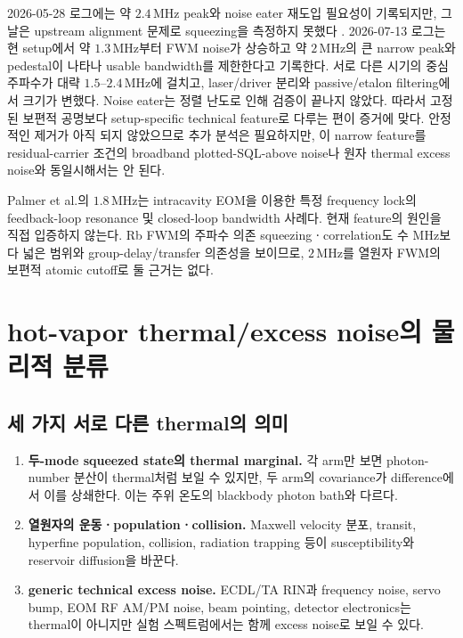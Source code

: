 \documentclass[11pt,a4paper]{article}
\newcommand{\MHz}{\,\mathrm{MHz}}
\begin{document}
2026-05-28 로그에는 약 $2.4\MHz$ peak와 noise eater 재도입 필요성이 기록되지만,
그날은 upstream alignment 문제로 squeezing을 측정하지 못했다
\cite{ExperimentLog20260528}. 2026-07-13 로그는 현 setup에서 약 $1.3\MHz$부터
FWM noise가 상승하고 약 $2\MHz$의 큰 narrow peak와 pedestal이 나타나 usable
bandwidth를 제한한다고 기록한다\cite{ExperimentLog20260713}. 서로 다른 시기의
중심주파수가 대략 $1.5$--$2.4\MHz$에 걸치고, laser/driver 분리와 passive/etalon
filtering에서 크기가 변했다. Noise eater는 정렬 난도로 인해 검증이 끝나지 않았다.
따라서 고정된 보편적 공명보다 setup-specific technical feature로 다루는 편이 증거에
맞다. 안정적인 제거가 아직 되지 않았으므로 추가 분석은 필요하지만, 이 narrow
feature를 residual-carrier 조건의
broadband plotted-SQL-above noise나 원자 thermal excess noise와 동일시해서는 안 된다.

Palmer et al.의 $1.8\MHz$는 intracavity EOM을 이용한 특정 frequency lock의
feedback-loop resonance 및 closed-loop bandwidth 사례다\cite{Palmer2022}. 현재
feature의 원인을 직접 입증하지 않는다. Rb FWM의 주파수 의존 squeezingㆍcorrelation도
수 MHz보다 넓은 범위와 group-delay/transfer 의존성을 보이므로, $2\MHz$를 열원자
FWM의 보편적 atomic cutoff로 둘 근거는 없다\cite{McCormick2008,deAraujo2024}.

\section{hot-vapor thermal/excess noise의 물리적 분류}

\subsection{세 가지 서로 다른 thermal의 의미}

\begin{enumerate}
\item \textbf{두-mode squeezed state의 thermal marginal.} 각 arm만 보면 photon-number
분산이 thermal처럼 보일 수 있지만, 두 arm의 covariance가 difference에서 이를
상쇄한다. 이는 주위 온도의 blackbody photon bath와 다르다.
\item \textbf{열원자의 운동ㆍpopulationㆍcollision.} Maxwell velocity 분포,
transit, hyperfine population, collision, radiation trapping 등이 susceptibility와
reservoir diffusion을 바꾼다.
\item \textbf{generic technical excess noise.} ECDL/TA RIN과 frequency noise,
servo bump, EOM RF AM/PM noise, beam pointing, detector electronics는 thermal이
아니지만 실험 스펙트럼에서는 함께 excess noise로 보일 수 있다.
\end{enumerate}
\end{document}
